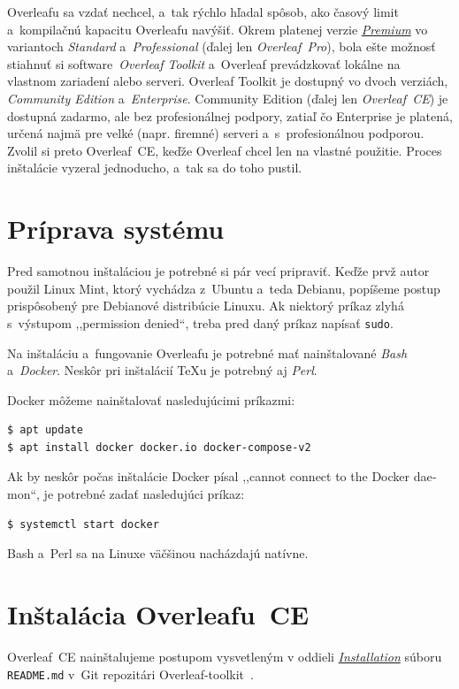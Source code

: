 \documentclass{csbulletin}
\begin{document}
Overleafu sa vzdať nechcel, a~tak rýchlo hľadal spôsob, ako časový limit a~kompilačnú kapacitu Overleafu navýšiť.
Okrem platenej verzie \href{https://www.overleaf.com/user/subscription/plans}{\textit{Premium}} vo variantoch \textit{Standard} a~\textit{Professional} (ďalej len \textit{Overleaf~Pro}), bola ešte možnosť stiahnuť si software~\textit{Overleaf Toolkit} a~Overleaf prevádzkovať lokálne na vlastnom zariadení alebo serveri. Overleaf Toolkit je dostupný vo dvoch verziách, \textit{Community Edition} a~\textit{Enterprise}. Community Edition (ďalej len \textit{Overleaf~CE}) je dostupná zadarmo, ale bez profesionálnej podpory, zatiaľ čo Enterprise je platená, určená najmä pre velké (napr. firemné) serveri a~s~profesionálnou podporou. Zvolil si preto Overleaf~CE, keďže Overleaf chcel len na vlastné použitie. Proces inštalácie vyzeral jednoducho, a~tak sa do toho pustil.

\section{Príprava systému}
Pred samotnou inštaláciou je potrebné si pár vecí pripraviť. Keďže prvž autor použil Linux Mint, ktorý vychádza z~Ubuntu a~teda Debianu, popíšeme postup prispôsobený pre Debianové distribúcie Linuxu. Ak niektorý príkaz zlyhá s~výstupom ,,\foreignlanguage{english}{permission denied}``, treba pred daný príkaz napísať \lstinline{sudo}.

Na inštaláciu a~fungovanie Overleafu je potrebné mať nainštalované \textit{Bash} a~\textit{Docker}. Neskôr pri inštalácií \TeX u je potrebný aj \textit{Perl}.

Docker môžeme nainštalovať nasledujúcimi príkazmi:
\begin{lstlisting}
$ apt update
$ apt install docker docker.io docker-compose-v2
\end{lstlisting}
%
Ak by neskôr počas inštalácie Docker písal ,,\foreignlanguage{english}{cannot connect to the Docker daemon}``, je potrebné zadať nasledujúci príkaz:
\begin{lstlisting}
$ systemctl start docker
\end{lstlisting}

Bash a~Perl sa na Linuxe väčšinou nacházdajú natívne.

\section{Inštalácia Overleafu~CE}
Overleaf~CE nainštalujeme postupom vysvetleným v oddieli \href{https://github.com/overleaf/toolkit}{\textit{Installation}} súboru \texttt{README.md} v~Git repozitári Overleaf-toolkit~\cite{overleaf_git}.
\end{document}
